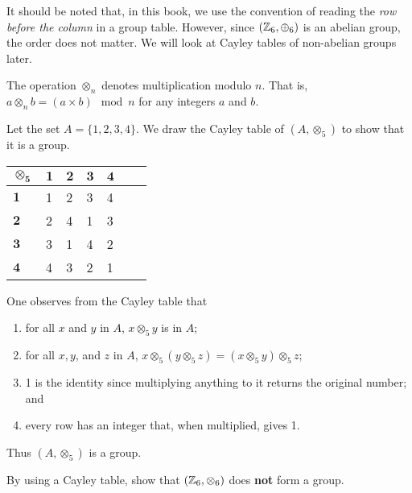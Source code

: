 It should be noted that, in this book, we use the convention of reading the \textit{row before the column} in a group table. However, since $(\mathbb{Z}_6, \oplus_6)$ is an abelian group, the order does not matter. We will look at Cayley tables of non-abelian groups later.

\begin{definition}
    The operation $\otimes_n$ denotes multiplication modulo $n$. That is, $a \otimes_n b = (a \times b) \mod{n}$ for any integers $a$ and $b$.
\end{definition}
\begin{example}
    Let the set $A = \{1, 2, 3, 4\}$. We draw the Cayley table of $(A, \otimes_5)$ to show that it is a group.
    \begin{table}[h]
        \centering
        \begin{tabular}{|l|l|l|l|l|l|l|}
        \hline
        $\boldsymbol{\otimes_5}$ & $\boldsymbol{1}$ & $\boldsymbol{2}$ & $\boldsymbol{3}$ & $\boldsymbol{4}$ \\ \hline
        $\boldsymbol{1}$          & 1          & 2          & 3          & 4          \\ \hline
        $\boldsymbol{2}$          & 2          & 4          & 1          & 3          \\ \hline
        $\boldsymbol{3}$          & 3          & 1          & 4          & 2          \\ \hline
        $\boldsymbol{4}$          & 4          & 3          & 2          & 1          \\ \hline
        \end{tabular}
    \end{table}

    One observes from the Cayley table that
    \begin{enumerate}
        \item for all $x$ and $y$ in $A$, $x \otimes_5 y$ is in $A$;
        \item for all $x, y$, and $z$ in $A$, $x \otimes_5 (y \otimes_5 z) = (x \otimes_5 y) \otimes_5 z$;
        \item 1 is the identity since multiplying anything to it returns the original number; and
        \item every row has an integer that, when multiplied, gives 1.
    \end{enumerate}
    Thus $(A, \otimes_5)$ is a group.
\end{example}

\begin{exercise}
    By using a Cayley table, show that $(\mathbb{Z}_6, \otimes_6)$ does \textbf{not} form a group.
\end{exercise}


